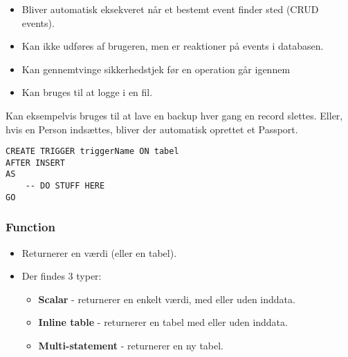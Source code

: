 \begin{itemize}
	\item Bliver automatisk eksekveret når et bestemt event finder sted (CRUD events).
	\item Kan ikke udføres af brugeren, men er reaktioner på events i databasen.
	\item Kan gennemtvinge sikkerhedstjek før en operation går igennem
	\item Kan bruges til at logge i en fil.
%	
\end{itemize}

Kan eksempelvis bruges til at lave en backup hver gang en record slettes. Eller, hvis en Person indsættes, bliver der automatisk oprettet et Passport.

\begin{lstlisting}[caption=Kodeeksempel for Trigger]
CREATE TRIGGER triggerName ON tabel
AFTER INSERT
AS
	-- DO STUFF HERE
GO
\end{lstlisting}

\subsubsection{Function}

\begin{itemize}
	\item Returnerer en værdi (eller en tabel).
	\item Der findes 3 typer:
	
	\begin{itemize}
		\item \textbf{Scalar} - returnerer en enkelt værdi, med eller uden inddata.
		\item \textbf{Inline table} - returnerer en tabel med eller uden inddata.
		\item \textbf{Multi-statement} - returnerer en ny tabel.
	\end{itemize}
\end{itemize}

